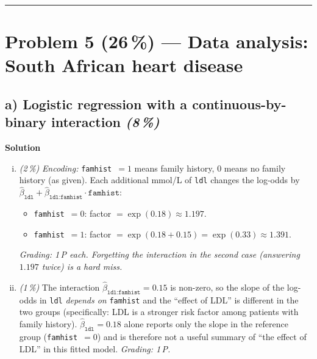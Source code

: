 \documentclass[11pt,a4paper]{article}
\newcommand{\points}[1]{\textbf{(#1\,\%)}}
\newcommand{\subpoints}[1]{\textit{(#1\,\%)}}
\newcommand{\sol}{\noindent\textbf{Solution}}
\begin{document}
\vspace{0.6em}
\hrule
\vspace{1em}

\section*{Problem 5 \points{26} --- Data analysis: South African heart disease}

\subsection*{a) Logistic regression with a continuous-by-binary interaction \subpoints{8}}
\sol{}
\begin{enumerate}[(i)]
  \item \subpoints{2} \emph{Encoding:} \texttt{famhist}~$=1$ means family history, $0$ means
        no family history (as given). Each additional mmol/L of \texttt{ldl} changes the
        log-odds by $\hat\beta_{\texttt{ldl}} + \hat\beta_{\texttt{ldl:famhist}}\cdot
        \texttt{famhist}$:
        \begin{itemize}
          \item \texttt{famhist}~$=0$: factor $= \exp(0.18) \approx \boxed{1.197}$.
          \item \texttt{famhist}~$=1$: factor $= \exp(0.18 + 0.15) = \exp(0.33) \approx \boxed{1.391}$.
        \end{itemize}
        \emph{Grading: 1\,P each. Forgetting the interaction in the second case (answering
        $1.197$ twice) is a hard miss.}

  \item \subpoints{1} The interaction $\hat\beta_{\texttt{ldl:famhist}} = 0.15$ is non-zero,
        so the slope of the log-odds in \texttt{ldl} \emph{depends on} \texttt{famhist} and the
        ``effect of LDL'' is different in the two groups (specifically: LDL is a stronger
        risk factor among patients with family history). $\hat\beta_{\texttt{ldl}} = 0.18$
        alone reports only the slope in the reference group (\texttt{famhist}~$=0$) and is
        therefore not a useful summary of ``the effect of LDL'' in this fitted model.
        \emph{Grading: 1\,P.}


\end{enumerate}
\end{document}
